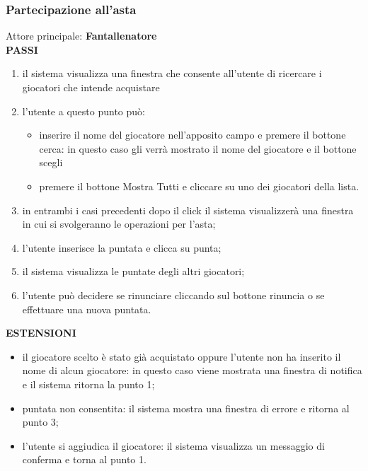 \documentclass[12pt,a4paper]{article}
\begin{document}
\subsubsection{Partecipazione all'asta}
Attore principale: \textbf{Fantallenatore}\\
\newline
\textbf{PASSI}
\begin{enumerate}
\item il sistema visualizza una finestra che consente all'utente di ricercare i giocatori che intende acquistare
\item l'utente  a questo punto può:
\begin{itemize}
\item inserire il nome del giocatore nell'apposito campo e premere il bottone cerca: in questo caso gli verrà mostrato il nome del giocatore e il bottone scegli
\item premere il bottone Mostra Tutti e cliccare su uno dei giocatori della lista.
\end{itemize}
\item in entrambi i casi precedenti dopo il click il sistema visualizzerà una finestra in cui si svolgeranno le operazioni per l'asta;
\item l'utente inserisce la puntata e clicca su punta;
\item il sistema visualizza le puntate degli altri giocatori;
\item l'utente può decidere se rinunciare cliccando sul bottone rinuncia o se effettuare una nuova puntata.
\end{enumerate}
\textbf{ESTENSIONI}
\begin{itemize}
\item il giocatore scelto è stato già acquistato oppure l'utente non ha inserito il nome di alcun giocatore: in questo caso viene mostrata una finestra di notifica e il sistema ritorna la punto 1;
\item puntata non consentita: il sistema mostra una finestra di errore e ritorna al punto 3;
\item l'utente si aggiudica il giocatore: il sistema visualizza un messaggio di conferma e torna al punto 1.
\end{itemize}
\end{document}
